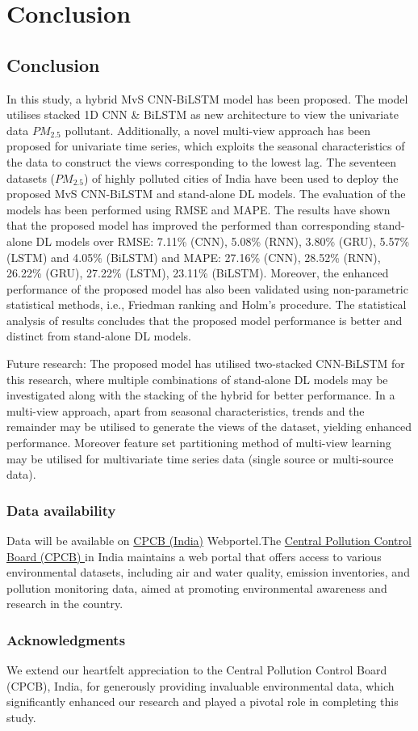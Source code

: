 
\chapter{Conclusion} %


\section{Conclusion}

In this study, a hybrid MvS CNN-BiLSTM model has been proposed. The model utilises stacked 1D CNN \& BiLSTM as new architecture to view the univariate data $PM_{2.5}$ pollutant. Additionally, a novel multi-view approach has been proposed for univariate time series, which exploits the seasonal characteristics of the data to construct the views corresponding to the lowest lag. The seventeen datasets ($PM_{2.5}$) of highly polluted cities of India have been used to deploy the proposed MvS CNN-BiLSTM and stand-alone DL models. The evaluation of the models has been performed using RMSE and MAPE. The results have shown that the proposed model has improved the performed than corresponding stand-alone DL models over RMSE:  7.11\% (CNN), 5.08\% (RNN), 3.80\% (GRU), 5.57\% (LSTM) and 4.05\% (BiLSTM) and MAPE: 27.16\% (CNN), 28.52\% (RNN), 26.22\% (GRU), 27.22\% (LSTM), 23.11\% (BiLSTM). Moreover, the enhanced performance of the proposed model has also been validated using non-parametric statistical methods, i.e., Friedman ranking and Holm's procedure. The statistical analysis of results concludes that the proposed model performance is better and distinct from stand-alone DL models.

Future research: The proposed model has utilised two-stacked CNN-BiLSTM for this research, where multiple combinations of stand-alone DL models may be investigated along with the stacking of the hybrid for better performance. In a multi-view approach, apart from seasonal characteristics, trends and the remainder may be utilised to generate the views of the dataset, yielding enhanced performance. Moreover feature set partitioning method of multi-view learning may be utilised for multivariate time series data (single source or multi-source data).  

\subsection*{Data availability}
Data will be available on \href{https: //app.cpcbccr.com/ccr/#/caaqm-dashboard-all/caaqm-landing}{CPCB (India)} Webportel.The \href{https: //www.cpcb.nic.in/}{Central Pollution Control Board (CPCB) } in India maintains a web portal that offers access to various environmental datasets,  including air and water quality,  emission inventories,  and pollution monitoring data,  aimed at promoting environmental awareness and research in the country.

\subsection*{Acknowledgments}
We extend our heartfelt appreciation to the Central Pollution Control Board (CPCB),  India,  for generously providing invaluable environmental data,  which significantly enhanced our research and played a pivotal role in completing this study.
